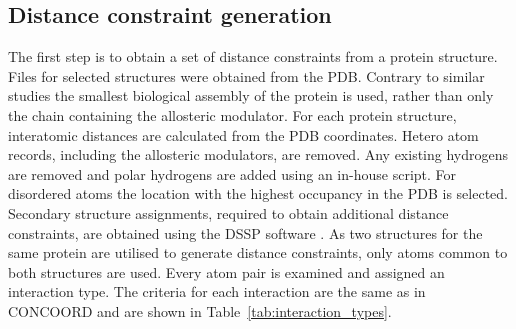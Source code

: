 \subsection{Distance constraint generation}

The first step is to obtain a set of distance constraints from a protein structure.
Files for selected structures were obtained from the PDB.
Contrary to similar studies \cite{Panjkovich2012, Huang2013} the smallest biological assembly of the protein is used, rather than only the chain containing the allosteric modulator.
For each protein structure, interatomic distances are calculated from the PDB coordinates.
Hetero atom records, including the allosteric modulators, are removed.
Any existing hydrogens are removed and polar hydrogens are added using an in-house script.
For disordered atoms the location with the highest occupancy in the PDB is selected.
Secondary structure assignments, required to obtain additional distance constraints, are obtained using the DSSP software \cite{Touw2015}.
As two structures for the same protein are utilised to generate distance constraints, only atoms common to both structures are used.
Every atom pair is examined and assigned an interaction type.
The criteria for each interaction are the same as in CONCOORD \cite{DeGroot1997} and are shown in Table~\ref{tab:interaction_types}.


